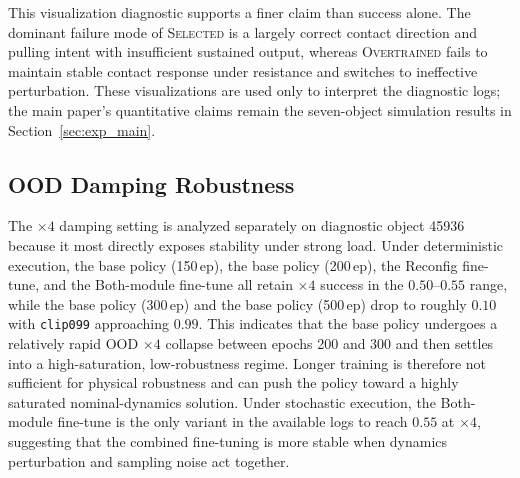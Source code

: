 This visualization diagnostic supports a finer claim than success
alone. The dominant failure mode of \textsc{Selected} is a largely
correct contact direction and pulling intent with insufficient
sustained output, whereas \textsc{Overtrained} fails to maintain stable
contact response under resistance and switches to ineffective
perturbation. These visualizations are used only to interpret the
diagnostic logs; the main paper's quantitative claims remain the
seven-object simulation results in Section~\ref{sec:exp_main}.


\subsection{OOD Damping Robustness}
\label{sec:ood}

The $\times4$ damping setting is analyzed separately on diagnostic
object 45936 because it most directly exposes stability under strong load.
Under deterministic
execution, the base policy (150\,ep), the base policy (200\,ep),
the Reconfig fine-tune, and the Both-module fine-tune all retain
$\times4$ success in the $0.50$--$0.55$ range, while
the base policy (300\,ep) and the base policy (500\,ep) drop to
roughly $0.10$ with \texttt{clip099} approaching $0.99$. This
indicates that the base policy undergoes a relatively rapid OOD $\times4$
collapse between epochs 200 and 300 and then settles into a
high-saturation, low-robustness regime. Longer training is therefore
not sufficient for physical robustness and can push the policy
toward a highly saturated nominal-dynamics solution. Under
stochastic execution, the Both-module fine-tune is the only variant in
the available logs to reach $0.55$ at $\times4$, suggesting that the
combined fine-tuning is more stable when dynamics perturbation and
sampling noise act together.

